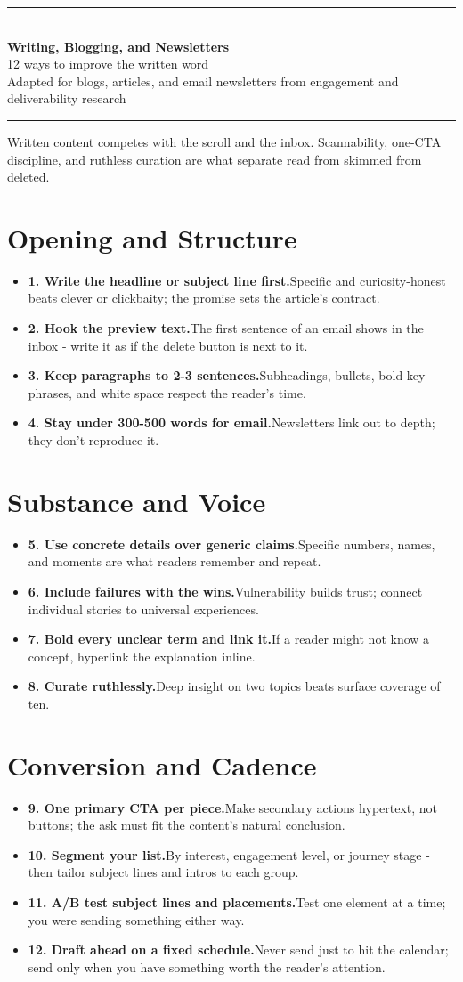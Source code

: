 \documentclass[11pt]{article}
\newcommand{\tip}[2]{\item \textbf{#1.}\enspace #2}
\newcommand{\tlabel}{\textcolor{accent}{\small$\blacktriangleright$}}
\newcommand{\footertitle}{Content Creation Playbook}
\newcommand{\docbanner}[3]{%
  \begin{center}
    {\color{accent}\rule{\textwidth}{1.4pt}}\\[10pt]
    {\Huge\bfseries\color{black} #1}\\[8pt]
    {\large\color{softgray} #2}\\[8pt]
    {\small\color{softgray} #3}\\[6pt]
    {\color{accent}\rule{\textwidth}{1.4pt}}
  \end{center}
  \vspace{6pt}
}
\begin{document}
\renewcommand{\footertitle}{Writing, Blogging, and Newsletters}
\docbanner{Writing, Blogging, and Newsletters}{12 ways to improve the written word}{Adapted for blogs, articles, and email newsletters from engagement and deliverability research}
\begin{tcolorbox}[colback=accent!5,colframe=accent,boxrule=0.8pt,arc=2pt,left=8pt,right=8pt,top=6pt,bottom=6pt]
\small Written content competes with the scroll and the inbox. Scannability, one-CTA discipline, and ruthless curation are what separate read from skimmed from deleted.
\end{tcolorbox}
\vspace{6pt}
\section*{Opening and Structure}
\begin{itemize}[label=\tlabel]
\tip{1. Write the headline or subject line first}{Specific and curiosity-honest beats clever or clickbaity; the promise sets the article's contract.}
\tip{2. Hook the preview text}{The first sentence of an email shows in the inbox - write it as if the delete button is next to it.}
\tip{3. Keep paragraphs to 2-3 sentences}{Subheadings, bullets, bold key phrases, and white space respect the reader's time.}
\tip{4. Stay under 300-500 words for email}{Newsletters link out to depth; they don't reproduce it.}
\end{itemize}
\section*{Substance and Voice}
\begin{itemize}[label=\tlabel]
\tip{5. Use concrete details over generic claims}{Specific numbers, names, and moments are what readers remember and repeat.}
\tip{6. Include failures with the wins}{Vulnerability builds trust; connect individual stories to universal experiences.}
\tip{7. Bold every unclear term and link it}{If a reader might not know a concept, hyperlink the explanation inline.}
\tip{8. Curate ruthlessly}{Deep insight on two topics beats surface coverage of ten.}
\end{itemize}
\section*{Conversion and Cadence}
\begin{itemize}[label=\tlabel]
\tip{9. One primary CTA per piece}{Make secondary actions hypertext, not buttons; the ask must fit the content's natural conclusion.}
\tip{10. Segment your list}{By interest, engagement level, or journey stage - then tailor subject lines and intros to each group.}
\tip{11. A/B test subject lines and placements}{Test one element at a time; you were sending something either way.}
\tip{12. Draft ahead on a fixed schedule}{Never send just to hit the calendar; send only when you have something worth the reader's attention.}
\end{itemize}
\end{document}

